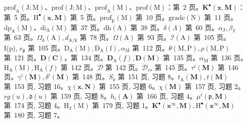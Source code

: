 
\(\mathrm{prof}_{\mathrm{A}}(\mathrm{J};\mathrm{M})\)、\(\mathrm{prof}(\mathrm{J};\mathrm{M})\)、\(\mathrm{prof}_{\mathrm{A}}(\mathrm{M})\)、\(\mathrm{prof}(\mathrm{M})\)：第~2 页。\(\mathbf{K}^{\bullet}(\mathbf{x},\mathbf{M})\)：第~5 页。\(\mathrm{H}^{\bullet}(\mathbf{x},\mathbf{M})\) 第~5 页。\(\mathrm{prof}_{\mathrm{F}}(\mathrm{M})\) 第~10 页。\(\mathrm{gradc}(\mathrm{N})\) 第~11 页。\(\mathrm{dp}_{\mathrm{A}}(\mathrm{M})\)、\(\mathrm{di}_{\mathrm{A}}(\mathrm{M})\) 第~37 页。\(\mathrm{dh(A)}\) 第~38 页。\(\delta (\Lambda)\) 第~60 页。\(\alpha_{\mathrm{J}},\beta_{\mathrm{J}}\) 第~63 页。\(\Omega_k(\mathrm{A}),d_{\mathrm{A / k}}\) 第~78 页。\(\Omega (\mathrm{A})\) 第~93 页。\(\mathcal{I}(\mathrm{A})\) 第~105 页。\\
I(p), \(e_{\mathfrak{p}}\) 第~105 页。\(\mathrm{D_A(M),D_A(f),}\alpha_{\mathrm{M}}\) 第~112 页。\(\theta (\mathrm{M},\mathrm{P}),\rho (\mathrm{M},\mathrm{P})\) 第~121 页。\(\mathbf{D}(\mathbf{C})\)，第~134 页。\(\mathbf{D}_{\mathrm{A}}(f),\mathbf{D}(\mathbf{M})\) 第~135 页。\(\alpha_{\mathrm{M}}\) 第~136 页。\(\mathrm{H}_{\mathrm{A}}(\mathrm{M}),\mathrm{H}_{\mathrm{A}}(f)\) 第~142 页。\(\mathcal{D}\) 第~142 页。\(\mathcal{D}_{cs}\) 第~145 页。\(\tau^i (\mathbf{M})\) 第~146 页。\(\gamma^i (\mathbf{M}),\delta^i (\mathbf{M})\) 第~148 页。\(S_{k}\) 第~151 页, 习题 8。\(t_\mathrm{A}(\mathbf{M}),t(\mathbf{M})\) 第~153 页, 习题 16。\(\chi (\mathbf{x},\mathbf{N})\) 第~155 页, 习题 6。\(\chi (\mathbf{M})\) 第~157 页, 习题 2。\(rg(u),\mathfrak{d}(u)\) 第~159 页, 习题 8。\(h_i(\mathbf{A})\) 第~166 页, 习题 4。\(\mu^i (\mathfrak{p},\mathbf{M})\) 第~174 页, 习题 4。\(\mathrm{H}_{\mathrm{J}}(\mathrm{M})\) 第~179 页, 习题 1。\(\mathbf{K}^{\bullet}(\mathbf{x}^{\infty},\mathbf{M}),\mathrm{H}^{\bullet}(\mathbf{x}^{\infty},\mathbf{M})\) 第~180 页, 习题 7。

